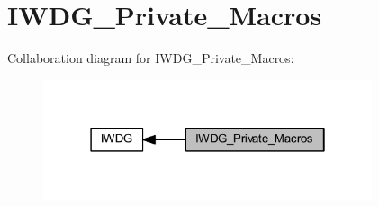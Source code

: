 \hypertarget{group___i_w_d_g___private___macros}{}\section{I\+W\+D\+G\+\_\+\+Private\+\_\+\+Macros}
\label{group___i_w_d_g___private___macros}
Collaboration diagram for I\+W\+D\+G\+\_\+\+Private\+\_\+\+Macros\+:
\nopagebreak
\begin{figure}[H]
\begin{center}
\leavevmode
\includegraphics[width=274pt]{group___i_w_d_g___private___macros}
\end{center}
\end{figure}
